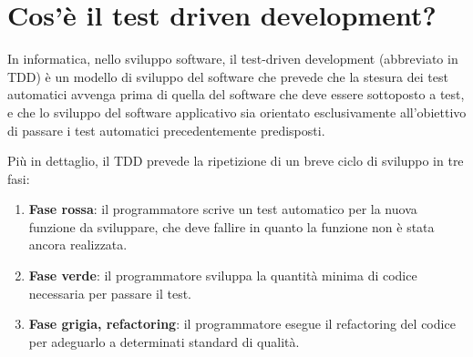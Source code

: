 \documentclass[11pt,a4paper]{book}
\begin{document}
\chapter{Cos'è il test driven development?}
In informatica, nello sviluppo software, il test-driven development (abbreviato in TDD) è un modello di sviluppo del software che prevede che la stesura dei test automatici avvenga prima di quella del software che deve essere sottoposto a test, e che lo sviluppo del software applicativo sia orientato esclusivamente all'obiettivo di passare i test automatici precedentemente predisposti.

Più in dettaglio, il TDD prevede la ripetizione di un breve ciclo di sviluppo in tre fasi:
\begin{enumerate}
	\item \textbf{Fase rossa}: il programmatore scrive un test automatico per la nuova funzione da sviluppare, che deve fallire in quanto la funzione non è stata ancora realizzata.
	\item \textbf{Fase verde}: il programmatore sviluppa la quantità minima di codice necessaria per passare il test.
	\item \textbf{Fase grigia, refactoring}: il programmatore esegue il refactoring del codice per adeguarlo a determinati standard di qualità.
\end{enumerate}
\end{document}
